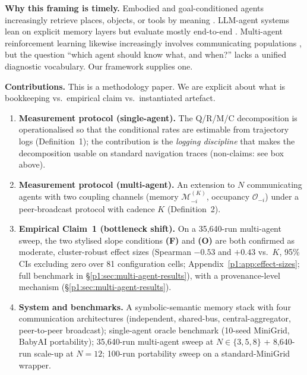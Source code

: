 \documentclass{article}
\begin{document}
\textbf{Why this framing is timely.} Embodied and goal-conditioned
agents increasingly retrieve places, objects, or tools by meaning
\citep{andrychowicz2017hindsight,ghosh2021learning,savva2019habitat}.
LLM-agent systems lean on explicit memory layers but evaluate mostly
end-to-end \citep{wang2023voyager,shinn2023reflexion,packer2023memgpt}.
Multi-agent reinforcement learning likewise increasingly involves
communicating populations \citep{lowe2017maddpg,foerster2018ctde}, but
the question ``which agent should know what, and when?'' lacks a
unified diagnostic vocabulary. Our framework supplies one.

\textbf{Contributions.} This is a methodology paper. We are explicit about what is bookkeeping vs.\ empirical claim vs.\ instantiated artefact.
\begin{enumerate}[leftmargin=20pt,itemsep=2pt,topsep=2pt]
\item \textbf{Measurement protocol (single-agent).} The Q/R/M/C decomposition is operationalised so that the conditional rates are estimable from trajectory logs (Definition~1); the contribution is the \emph{logging discipline} that makes the decomposition usable on standard navigation traces (non-claims: see box above).

\item \textbf{Measurement protocol (multi-agent).} An extension to $N$ communicating agents with two coupling channels (memory $\mathcal{M}_{-i}^{(K)}$, occupancy $\mathcal{O}_{-i}$) under a peer-broadcast protocol with cadence $K$ (Definition~2).

\item \textbf{Empirical Claim~1 (bottleneck shift).} On a 35{,}640-run multi-agent sweep, the two stylised slope conditions \textbf{(F)} and \textbf{(O)} are both confirmed as moderate, cluster-robust effect sizes (Spearman $-0.53$ and $+0.43$ vs.\ $K$, 95\% CIs excluding zero over 81 configuration cells; Appendix~\ref{p1:app:effect-sizes}; full benchmark in \S\ref{p1:sec:multi-agent-results}), with a provenance-level mechanism (\S\ref{p1:sec:multi-agent-results}).

\item \textbf{System and benchmarks.} A symbolic-semantic memory stack with four communication architectures (independent, shared-bus, central-aggregator, peer-to-peer broadcast); single-agent oracle benchmark (10-seed MiniGrid, BabyAI portability); 35{,}640-run multi-agent sweep at $N\!\in\!\{3,5,8\}$ + 8{,}640-run scale-up at $N\!=\!12$; 100-run portability sweep on a standard-MiniGrid wrapper.


\end{enumerate}
\end{document}
